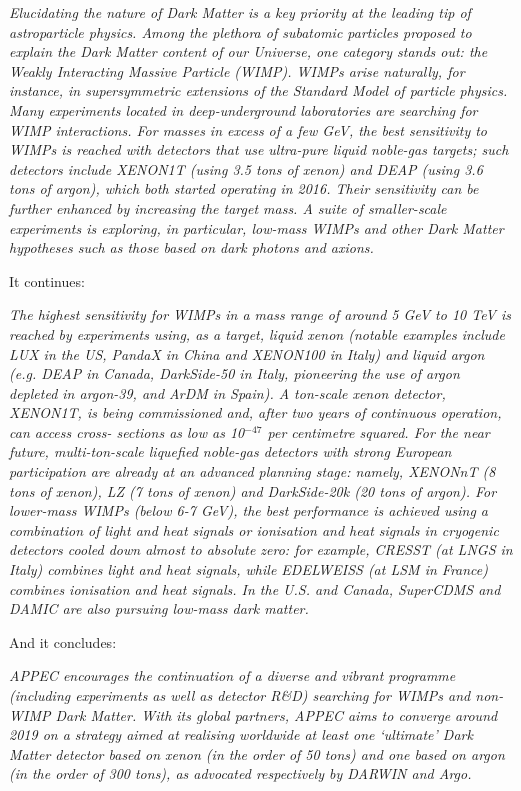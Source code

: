 {\it Elucidating the nature of Dark Matter is a key priority at the leading tip of astroparticle physics.  Among the plethora of subatomic particles proposed to explain the Dark Matter content of our Universe, one category stands out: the Weakly Interacting Massive Particle (WIMP).  WIMPs arise naturally, for instance, in supersymmetric extensions of the Standard Model of particle physics. Many experiments located in deep-underground laboratories are searching for WIMP interactions.  For masses in excess of a few GeV, the best sensitivity to WIMPs is reached with detectors that use ultra-pure liquid noble-gas targets; such detectors include XENON1T (using 3.5 tons of xenon) and DEAP (using 3.6 tons of argon), which both started operating in 2016.  Their sensitivity can be further enhanced by increasing the target mass. A suite of smaller-scale experiments is exploring, in particular, low-mass WIMPs and other Dark Matter hypotheses such as those based on dark photons and axions.}

It continues:

{\it The highest sensitivity for WIMPs in a mass range of around 5 GeV to 10 TeV is reached by experiments using, as a target, liquid xenon (notable examples include LUX in the US, PandaX in China and XENON100 in Italy) and liquid argon (e.g. DEAP in Canada, DarkSide-50 in Italy, pioneering the use of argon depleted in argon-39, and ArDM in Spain).  A ton-scale xenon detector, XENON1T, is being commissioned and, after two years of continuous operation, can access cross- sections as low as 10$^{-47}$ per centimetre squared.  For the near future, multi-ton-scale liquefied noble-gas detectors with strong European participation are already at an advanced planning stage: namely, XENONnT (8 tons of xenon), LZ (7 tons of xenon) and DarkSide-20k (20 tons of argon).  For lower-mass WIMPs (below 6-7 GeV), the best performance is achieved using a combination of light and heat signals or ionisation and heat signals in cryogenic detectors cooled down almost to absolute zero: for example, CRESST (at LNGS in Italy) combines light and heat signals, while EDELWEISS (at LSM in France) combines ionisation and heat signals.  In the U.S. and Canada, SuperCDMS and DAMIC are also pursuing low-mass dark matter.}

And it concludes:

{\it APPEC encourages the continuation of a diverse and vibrant programme (including experiments as well as detector R\&D) searching for WIMPs and non-WIMP Dark Matter. With its global partners, APPEC aims to converge around 2019 on a strategy aimed at realising worldwide at least one `ultimate' Dark Matter detector based on xenon (in the order of 50 tons) and one based on argon (in the order of 300 tons), as advocated respectively by DARWIN and Argo.}


